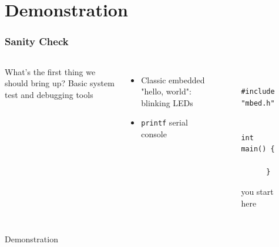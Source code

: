 \documentclass{beamer}
\begin{document}
\section{Demonstration} %
\begin{frame}[fragile]
\frametitle{Sanity Check}
\begin{columns}[t]
  What's the first thing we should bring up?
  \hfill \break
  \hfill \break
   {
  Basic system test and debugging tools
  }
   {
  \begin{itemize}
      \item Classic embedded "hello, world": blinking LEDs
      \item \texttt{printf} serial console
  \end{itemize}
  }
  \begin{figure}
    \centering
    {\tiny
      \lstset{language=C++}
      \begin{lstlisting}
      #include "mbed.h"

      int main() {
      
      }
      \end{lstlisting}
    }
    you start here
  \end{figure}
\end{columns}
\end{frame}

\begin{frame}
\centering \huge Demonstration
\end{frame}
\end{document}
